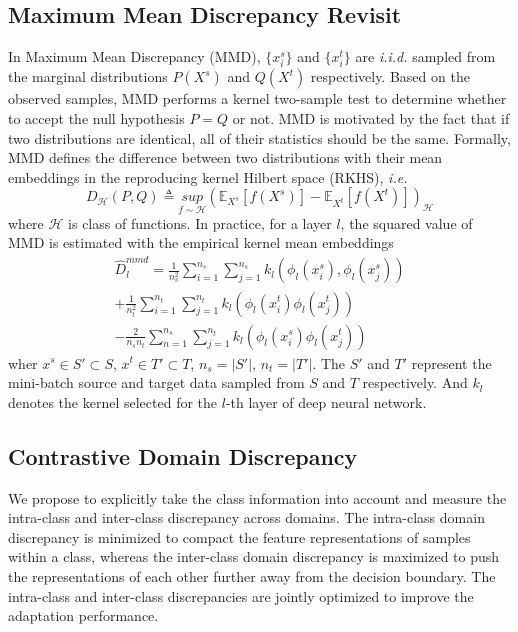 \documentclass[conference]{IEEEtran}
\begin{document}
\subsection{Maximum Mean Discrepancy Revisit}
In Maximum Mean Discrepancy (MMD), $\{x^s_i\}$ and $\{x^t_i\}$ are \textit{i.i.d.} sampled from the marginal distributions $P(X^s)$ and $Q(X^t)$ respectively.
Based on the observed samples, MMD performs a kernel two-sample test to determine whether to accept the null hypothesis $P=Q$ or not.
MMD is motivated by the fact that if two distributions are identical, all of their statistics should be the same.
Formally, MMD defines the difference between two distributions with their mean embeddings in the reproducing kernel Hilbert space (RKHS), \textit{i.e.}
\begin{equation}
    D_\mathcal{H} (P, Q) \triangleq \underset{f \sim \mathcal{H}}{sup}(\mathbb{E}_{X^s}[f(X^s)] - \mathbb{E}_{X^t}[f(X^t)] )_\mathcal{H}
\end{equation}
where $\mathcal{H}$ is class of functions.
In practice, for a layer $l$, the squared value of MMD is estimated with the empirical kernel mean embeddings
\begin{equation}
    \begin{split}
    \hat{D}^{mmd}_l = \frac{1}{n^2_s}\sum_{i=1}^{n_s} \sum_{j=1}^{n_s} k_l(\phi_l(x^s_i), \phi_l(x^s_j) ) \\
    + \frac{1}{n^2_t} \sum_{i=1}^{n_t} \sum_{j=1}^{n_t} k_l(\phi_l(x^t_i) \phi_l(x^t_j)) \\
    - \frac{2}{n_s n_t} \sum_{n=1}^{n_s} \sum_{j=1}^{n_t} k_l(\phi_l(x^s_i) \phi_l(x^t_j))
    \end{split}
\end{equation}
wher $x^s \in S' \subset S$, $x^t \in T' \subset T$, 
$n_s = \left\lvert S' \right\rvert$, $n_t = \left\lvert T' \right\rvert$.
The $S'$ and $T'$ represent the mini-batch source and target data sampled from $S$ and $T$ respectively.
And $k_l$ denotes the kernel selected for the $l$-th layer of deep neural network.

\subsection{Contrastive Domain Discrepancy}
We propose to explicitly take the class information into account and measure the intra-class and inter-class discrepancy across domains.
The intra-class domain discrepancy is minimized to compact the feature representations of samples within a class, whereas the inter-class domain discrepancy is maximized to push the representations of each other further away from the decision boundary.
The intra-class and inter-class discrepancies are jointly optimized to improve the adaptation performance.
\end{document}
